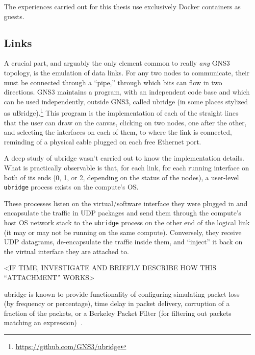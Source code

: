 The experiences carried out for this thesis use exclusively Docker containers as guests.

\subsection{Links}
\label{subsec:links}

A crucial part, and arguably the only element common to really \emph{any} GNS3 topology, is the emulation of data links.
For any two nodes to communicate, their  must be connected through a ``pipe,'' through which bits can flow in two directions.
GNS3 maintains a program, with an independent code base and which can be used independently, outside GNS3, called ubridge (in some places stylized as uBridge).\footnote{\url{https://github.com/GNS3/ubridge}}
This program is the implementation of each of the straight lines that the user can draw on the canvas, clicking on two nodes, one after the other, and selecting the interfaces on each of them, to where the link is connected, reminding of a physical cable plugged on each free Ethernet port.

A deep study of ubridge wasn't carried out to know the implementation details.
What is practically observable is that, for each link, for each running interface on both of its ends (0, 1, or 2, depending on the status of the nodes), a user-level \texttt{ubridge} process exists on the compute's OS.

These processes listen on the virtual/software interface they were plugged in and encapsulate the traffic in UDP packages and send them through the compute's host OS network stack to the \texttt{ubridge} process on the other end of the logical link (it may or may not be running on the same compute). %
Conversely, they receive UDP datagrams, de-encapsulate the traffic inside them, and ``inject'' it back on the virtual interface they are attached to.

<IF TIME, INVESTIGATE AND BRIEFLY DESCRIBE HOW THIS ``ATTACHMENT'' WORKS> %

ubridge is known to provide functionality of configuring simulating packet loss (by frequency or percentage), time delay in packet delivery, corruption of a fraction of the packets, or a Berkeley Packet Filter (for filtering out packets matching an expression)~\cite{ubridgereadme}.


